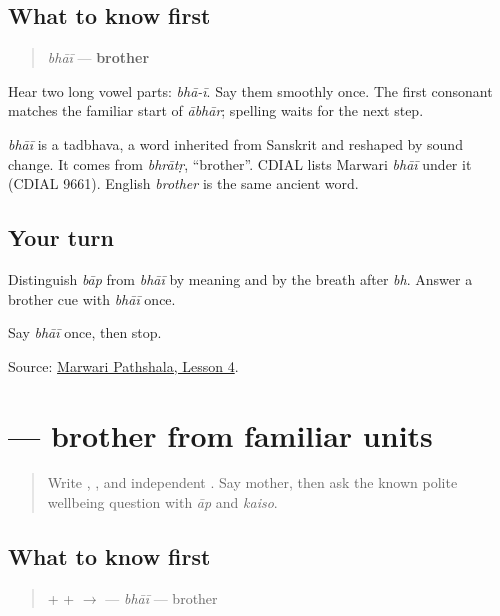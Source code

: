 \subsection*{What to know first}
\begin{quote}
\emph{bhāī} — \textbf{brother}
\end{quote}

Hear two long vowel parts: \emph{bhā-ī}. Say them smoothly once. The first consonant matches the familiar start of \emph{ābhār}; spelling waits for the next step.

\begin{cousinweb}
\emph{bhāī} is a tadbhava, a word inherited from Sanskrit and reshaped by sound change. It comes from \emph{bhrātṛ}, \textquotedblleft{}brother\textquotedblright{}. CDIAL lists Marwari \emph{bhāī} under it (CDIAL 9661). English \emph{brother} is the same ancient word.
\end{cousinweb}

\subsection*{Your turn}
Distinguish \emph{bāp} from \emph{bhāī} by meaning and by the breath after \emph{bh}. Answer a brother cue with \emph{bhāī} once.

\begin{tcolorbox}[breakable,colback=teal!4,colframe=teal!35!black,title={Before you move on}]
Say \emph{bhāī} once, then stop.

Source: \href{https://www.marwaripathshala.com/marwari-lesson-4-english}{Marwari Pathshala, Lesson 4}.
\end{tcolorbox}
\section[\texorpdfstring{\mw{भाई} (bhāī)}{भाई (bhāī)}]{ — brother from familiar units}

\label{lesson:MW-C08-bhai}



\begin{quote}
Write \textbf{}, \textbf{}, and independent \textbf{}. Say mother, then ask the known polite wellbeing question with \emph{āp} and \emph{kaiso}.
\end{quote}

\subsection*{What to know first}
\begin{quote}
\textbf{} + \textbf{} + \textbf{} $\to$ \textbf{} — \emph{bhāī} — brother
\end{quote}

